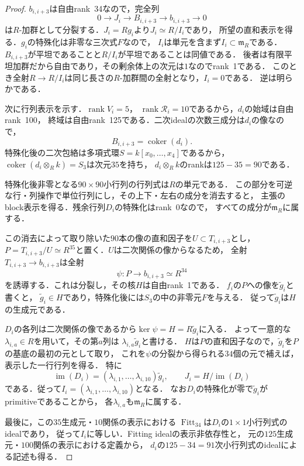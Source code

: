 \begin{proof}
$b_{i,i+3}$は自由rank~34なので，完全列
\[
 0\longrightarrow J_i\longrightarrow B_{i,i+3}
 \longrightarrow b_{i,i+3}\longrightarrow0
\]
は$R$-加群として分裂する．$J_i=Rg_i$より$J_i\simeq R/I_i$であり，
所望の直和表示を得る．$g_i$の特殊化は非零な三次式$F$なので，
$I_i$は単元を含まず$I_i\subset\mathfrak m_R$である．
$B_{i,i+3}$が平坦であることと$R/I_i$が平坦であることは同値である．
後者は有限平坦加群だから自由であり，その剰余体上の次元は$1$なのでrank~1である．
このとき全射$R\to R/I_i$は同じ長さの$R$-加群間の全射となり，$I_i=0$である．
逆は明らかである．

次に行列表示を示す．$\operatorname{rank}V_i=5$，
$\operatorname{rank}\mathcal R_i=10$であるから，$d_i$の始域は自由rank~100，
終域は自由rank~125である．二次idealの次数三成分は$d_i$の像なので，
\[
 B_{i,i+3}=\operatorname{coker}(d_i).
\]
特殊化後の二次包絡は多項式環$S=k[x_0,\ldots,x_4]$であるから，
$\operatorname{coker}(d_i\otimes_R k)=S_3$は次元$35$を持ち，
$d_i\otimes_R k$のrankは$125-35=90$である．

特殊化後非零となる$90\times90$小行列の行列式は$R$の単元である．
この部分を可逆な行・列操作で単位行列にし，その上下・左右の成分を消去すると，
主張のblock表示を得る．残余行列$D_i$の特殊化はrank~0なので，
すべての成分が$\mathfrak m_R$に属する．

この消去によって取り除いた$90$本の像の直和因子を$U\subset T_{i,i+3}$とし，
$P=T_{i,i+3}/U\simeq R^{35}$と置く．$U$は二次関係の像からなるため，
全射$T_{i,i+3}\to b_{i,i+3}$は全射
\[
 \psi:P\longrightarrow b_{i,i+3}\simeq R^{34}
\]
を誘導する．これは分裂し，その核$H$は自由rank~1である．
$f_i$の$P$への像を$\widetilde g_i$と書くと，
$\widetilde g_i\in H$であり，特殊化後には$S_3$の中の非零元$F$を与える．
従って$\widetilde g_i$は$H$の生成元である．

$D_i$の各列は二次関係の像であるから$\ker\psi=H=R\widetilde g_i$に入る．
よって一意的な$\lambda_{i,a}\in R$を用いて，その第$a$列は
$\lambda_{i,a}\widetilde g_i$と書ける．
$H$は$P$の直和因子なので，$\widetilde g_i$を$P$の基底の最初の元として取り，
これを$\psi$の分裂から得られる$34$個の元で補えば，表示した一行行列を得る．
特に
\[
 \operatorname{im}(D_i)
   =(\lambda_{i,1},\ldots,\lambda_{i,10})\widetilde g_i,
 \qquad
 J_i=H/\operatorname{im}(D_i)
\]
である．従って$I_i=(\lambda_{i,1},\ldots,\lambda_{i,10})$となる．
なお$D_i$の特殊化が零で$\widetilde g_i$がprimitiveであることから，
各$\lambda_{i,a}$も$\mathfrak m_R$に属する．

最後に，この$35$生成元・$10$関係の表示における
$\operatorname{Fitt}_{34}$は$D_i$の$1\times1$小行列式のidealであり，
従って$I_i$に等しい．Fitting idealの表示非依存性と，
元の$125$生成元・$100$関係の表示における定義から，
$d_i$の$125-34=91$次小行列式のidealによる記述も得る．
\end{proof}

